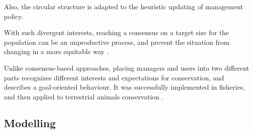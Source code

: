 \documentclass[12pt,a4paper]{article}
\begin{document}
Also, the circular structure is adapted to the heuristic updating of management policy.

With such divergent interests, reaching a consensus on a target size for the population can be an unproductive process, and prevent the situation from changing in a more equitable way \citep{peterson2005conservation}. 


Unlike consensus-based approaches, placing managers and users into two different parts recognizes different interests and expectations for conservation, and describes a goal-oriented behaviour. %
It was successfully implemented in fisheries, and then applied to terrestrial animals conservation \citep{BUNNEFELD2011441, bunnefeld2013incentivizing}.

\subsection{Modelling}
\end{document}
